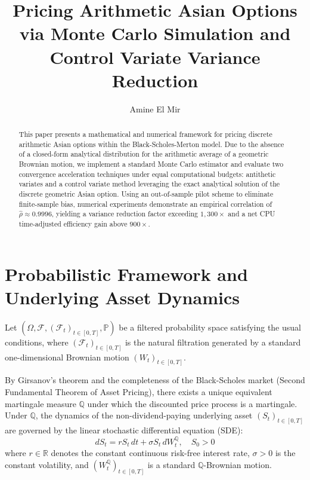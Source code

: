 \documentclass[11pt,a4paper]{article}
\title{\textbf{Pricing Arithmetic Asian Options via Monte Carlo Simulation and Control Variate Variance Reduction}}
\author{Amine El Mir}
\newcommand{\R}{\mathbb{R}}
\newcommand{\Q}{\mathbb{Q}}
\newcommand{\Prob}{\mathbb{P}}
\newcommand{\F}{\mathcal{F}}
\begin{document}
\maketitle

\begin{abstract}
This paper presents a mathematical and numerical framework for pricing discrete arithmetic Asian options within the Black-Scholes-Merton model. Due to the absence of a closed-form analytical distribution for the arithmetic average of a geometric Brownian motion, we implement a standard Monte Carlo estimator and evaluate two convergence acceleration techniques under equal computational budgets: antithetic variates and a control variate method leveraging the exact analytical solution of the discrete geometric Asian option. Using an out-of-sample pilot scheme to eliminate finite-sample bias, numerical experiments demonstrate an empirical correlation of $\hat{\rho} \approx 0.9996$, yielding a variance reduction factor exceeding $1,300\times$ and a net CPU time-adjusted efficiency gain above $900\times$.
\end{abstract}

\section{Probabilistic Framework and Underlying Asset Dynamics}

Let $(\Omega, \F, (\F_t)_{t \in [0,T]}, \Prob)$ be a filtered probability space satisfying the usual conditions, where $(\F_t)_{t \in [0,T]}$ is the natural filtration generated by a standard one-dimensional Brownian motion $(W_t)_{t \in [0,T]}$.

By Girsanov's theorem and the completeness of the Black-Scholes market (Second Fundamental Theorem of Asset Pricing), there exists a unique equivalent martingale measure $\Q$ under which the discounted price process is a martingale. Under $\Q$, the dynamics of the non-dividend-paying underlying asset $(S_t)_{t \in [0,T]}$ are governed by the linear stochastic differential equation (SDE):
\begin{equation}
    dS_t = r S_t \, dt + \sigma S_t \, dW_t^\Q, \quad S_0 > 0
\end{equation}
where $r \in \R$ denotes the constant continuous risk-free interest rate, $\sigma > 0$ is the constant volatility, and $(W_t^\Q)_{t \in [0,T]}$ is a standard $\Q$-Brownian motion.
\end{document}
